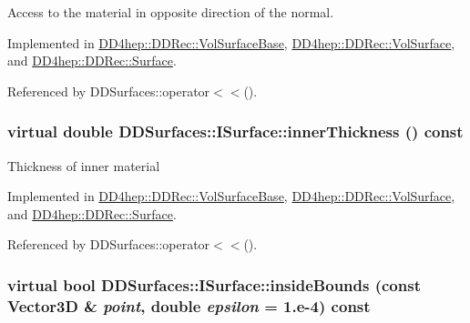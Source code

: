 Access to the material in opposite direction of the normal. 

Implemented in \hyperlink{class_d_d4hep_1_1_d_d_rec_1_1_vol_surface_base_a55f7258fad63f0224e7f5db301596baf}{DD4hep::DDRec::VolSurfaceBase}, \hyperlink{class_d_d4hep_1_1_d_d_rec_1_1_vol_surface_a9f25046b9bac451dd240aa7b020d704a}{DD4hep::DDRec::VolSurface}, and \hyperlink{class_d_d4hep_1_1_d_d_rec_1_1_surface_a923794ef06f1fb5364e68f60b99b7159}{DD4hep::DDRec::Surface}.

Referenced by DDSurfaces::operator$<$$<$().\hypertarget{class_d_d_surfaces_1_1_i_surface_ab6913582dd6c1f44df2038705ce2aea6}{
\subsubsection[{innerThickness}]{\setlength{\rightskip}{0pt plus 5cm}virtual double DDSurfaces::ISurface::innerThickness () const}}
\label{class_d_d_surfaces_1_1_i_surface_ab6913582dd6c1f44df2038705ce2aea6}
Thickness of inner material 

Implemented in \hyperlink{class_d_d4hep_1_1_d_d_rec_1_1_vol_surface_base_ad47a7a1236d529ba5263bc5bf9bd3fbc}{DD4hep::DDRec::VolSurfaceBase}, \hyperlink{class_d_d4hep_1_1_d_d_rec_1_1_vol_surface_a21b75812c52fa387e58ce0ac7a25aaca}{DD4hep::DDRec::VolSurface}, and \hyperlink{class_d_d4hep_1_1_d_d_rec_1_1_surface_a4efd4a2e74c6435916cef09328cc436c}{DD4hep::DDRec::Surface}.

Referenced by DDSurfaces::operator$<$$<$().\hypertarget{class_d_d_surfaces_1_1_i_surface_a16aa78cb8c01cd5993b7cf23f55a7e3a}{
\subsubsection[{insideBounds}]{\setlength{\rightskip}{0pt plus 5cm}virtual bool DDSurfaces::ISurface::insideBounds (const {\bf Vector3D} \& {\em point}, \/  double {\em epsilon} = {\ttfamily 1.e-\/4}) const}}
\label{class_d_d_surfaces_1_1_i_surface_a16aa78cb8c01cd5993b7cf23f55a7e3a}


